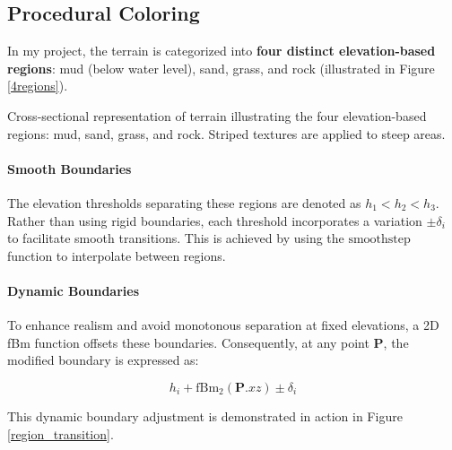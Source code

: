 





\subsection{Procedural Coloring}
\label{Terrain Procedural Texturing}

In my project, the terrain is categorized into \textbf{four distinct elevation-based regions}: mud (below water level), sand, grass, and rock (illustrated in Figure \ref{4regions}).

{Cross-sectional representation of terrain illustrating the four elevation-based regions: mud, sand, grass, and rock. Striped textures are applied to steep areas.}

\paragraph{Smooth Boundaries}
The elevation thresholds separating these regions are denoted as $h_{1} < h_{2} < h_{3}$. Rather than using rigid boundaries, each threshold incorporates a variation $\pm \delta_i$ to facilitate smooth transitions. This is achieved by using the $\text{smoothstep}$ function to interpolate between regions.

\paragraph{Dynamic Boundaries}
To enhance realism and avoid monotonous separation at fixed elevations, a 2D fBm function offsets these boundaries. Consequently, at any point $\mathbf{P}$, the modified boundary is expressed as:

\begin{equation}
    h_{i} + \text{fBm}_{2}(\mathbf{P}.xz) \pm \delta_i
\end{equation}

This dynamic boundary adjustment is demonstrated in action in Figure \ref{region_transition}.



